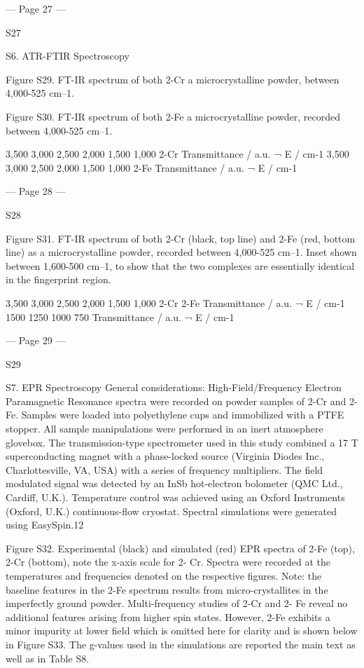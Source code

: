  


--- Page 27 ---
 
 
S27 
 
 
S6. ATR-FTIR Spectroscopy 
 
Figure S29. FT-IR spectrum of both 2-Cr a microcrystalline powder, between 4,000-525 cm–1. 
 
Figure S30. FT-IR spectrum of both 2-Fe a microcrystalline powder, recorded between 4,000-525 cm–1. 
 
 
3,500
3,000
2,500
2,000
1,500
1,000
2-Cr
Transmittance / a.u.
¬ E / cm-1
3,500
3,000
2,500
2,000
1,500
1,000
2-Fe
Transmittance / a.u.
¬ E / cm-1


--- Page 28 ---
 
 
S28 
 
 
 
Figure S31. FT-IR spectrum of both 2-Cr (black, top line) and 2-Fe (red, bottom line) as a microcrystalline powder, recorded 
between 4,000-525 cm–1. Inset shown between 1,600-500 cm–1, to show that the two complexes are essentially identical in the 
fingerprint region. 
 
 
3,500
3,000
2,500
2,000
1,500
1,000
2-Cr
2-Fe
Transmittance / a.u.
¬ E / cm-1
1500
1250
1000
750
Transmittance / a.u.
¬ E / cm-1


--- Page 29 ---
 
 
S29 
 
 
S7. EPR Spectroscopy 
General considerations: High-Field/Frequency Electron Paramagnetic Resonance spectra were recorded on powder samples 
of 2-Cr and 2-Fe. Samples were loaded into polyethylene cups and immobilized with a PTFE stopper. All sample 
manipulations were performed in an inert atmosphere glovebox. The transmission-type spectrometer used in this study 
combined a 17 T superconducting magnet with a phase-locked source (Virginia Diodes Inc., Charlottesville, VA, USA) with 
a series of frequency multipliers. The field modulated signal was detected by an InSb hot-electron bolometer (QMC Ltd., 
Cardiff, U.K.). Temperature control was achieved using an Oxford Instruments (Oxford, U.K.) continuous-flow cryostat. 
Spectral simulations were generated using EasySpin.12 
 
 
Figure S32. Experimental (black) and simulated (red) EPR spectra of 2-Fe (top), 2-Cr (bottom), note the x-axis scale for 2-
Cr. Spectra were recorded at the temperatures and frequencies denoted on the respective figures. Note: the baseline features 
in the 2-Fe spectrum results from micro-crystallites in the imperfectly ground powder. Multi-frequency studies of 2-Cr and 2-
Fe reveal no additional features arising from higher spin states. However, 2-Fe exhibits a minor impurity at lower field which 
is omitted here for clarity and is shown below in Figure S33. The g-values used in the simulations are reported the main text 
as well as in Table S8. 
 
